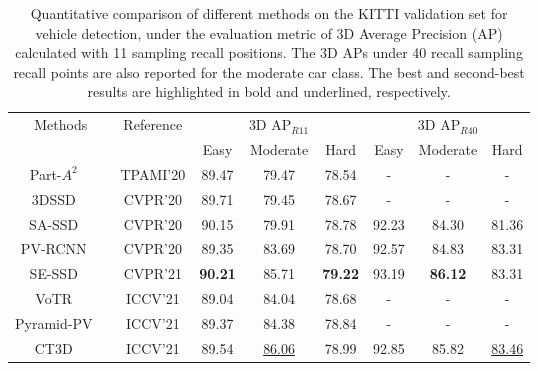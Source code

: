 \documentclass[twocolumn]{svjour3}
\begin{document}
\setlength{\tabcolsep}{12pt}
\begin{table*}[htp]
\centering
\caption{Quantitative comparison of different methods on the KITTI validation set for vehicle detection, under the evaluation metric of 3D Average Precision (AP) calculated with 11 sampling recall positions. The 3D APs under 40 recall sampling recall points are also reported for the moderate car class. The best and second-best results are highlighted in bold and underlined, respectively.}
\label{table:kitti_val}
\begin{tabular}{c|c|ccc|ccc} 
\hline
\multirow{2}{*}{Methods} & \multirow{2}{*}{Reference} & \multicolumn{3}{c|}{3D $\mathrm{AP}_{R11}$} & \multicolumn{3}{c}{3D $\mathrm{AP}_{R40}$}  \\
&                            & Easy  & Moderate & Hard                     & Easy  & Moderate & Hard                     \\ 
\hline
Part-$A^2$~\citep{shi2020points}~             & TPAMI'20                 & 89.47 & 79.47    & 78.54                    & -     & -        & -                      \\
3DSSD~\citep{yang20203dssd}~                  & CVPR'20                  & 89.71 & 79.45    & 78.67                    & -     & -        & -                      \\
SA-SSD~\citep{He_2020_CVPR}~                 & CVPR'20                  & 90.15 & 79.91    & 78.78                    & 92.23 & 84.30    & 81.36                  \\
PV-RCNN~\citep{shi2020pv}~                & CVPR'20                  & 89.35 & 83.69    & 78.70                    & 92.57 & 84.83    & 83.31                  \\
SE-SSD~\citep{zheng2021se}~                 & CVPR'21                  & \textbf{90.21} & 85.71    & \textbf{79.22}                    & 93.19 & \textbf{86.12}    & 83.31                  \\
VoTR~\citep{mao2021voxel}~                   & ICCV'21                  & 89.04 & 84.04    & 78.68                    & -     & -        & -                      \\
Pyramid-PV~\citep{Mao_2021_ICCV}~             & ICCV'21                  & 89.37 & 84.38    & 78.84                    & -     & -        & -                      \\
CT3D~\citep{sheng2021improving}~                   & ICCV'21                  & 89.54 & \underline{86.06}    & 78.99                    & 92.85 & 85.82    & \underline{83.46}                  \\ 

\end{tabular}
\end{table*}
\end{document}
